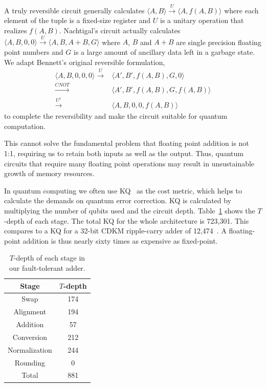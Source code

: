 \documentclass[%
reprint11,
 amsmath,amssymb,
 aps,
]{revtex4-1}
\begin{document}
\par A truly reversible circuit generally calculates $ \langle A,B
\rangle \xrightarrow{U} \langle A,f(A,B) \rangle $ where each element
of the tuple is a fixed-size register and $U$ is a unitary operation
that realizes $f(A,B)$. Nachtigal's circuit actually calculates $
\langle A,B,0,0 \rangle \xrightarrow{U} \langle A,B,A+B,G \rangle$
where $A$, $B$ and $A+B$ are single precision floating point numbers
and $G$ is a large amount of ancillary data left in a garbage
state. We adapt Bennett's original reversible formulation,
\begin{align}
   \langle A,B,0,0,0 \rangle \xrightarrow{U} & \langle A',B',f(A,B),G,0 \rangle \\\nonumber
   \xrightarrow{CNOT} & \langle A',B',f(A,B),G,f(A,B) \rangle  \\\nonumber
   \xrightarrow{U^\dag} & \langle A,B,0,0,f(A,B) \rangle 
\label{eqn:Benett}
\end{align}
to complete the reversibility and make the circuit suitable for quantum computation.

\par This cannot solve the fundamental problem that floating point
addition is not 1:1, requiring us to retain both inputs as well as the
output. Thus, quantum circuits that require many floating point
operations may result in unsustainable growth of memory resources.

In quantum computing we often use KQ~\cite{fault-tolerant} as the cost
metric, which helps to calculate the demands on quantum error
correction. KQ is calculated by multiplying the number of qubits used
and the circuit depth.  Table~\ref{tab:T-depth} shows the $T$-depth of
each stage.  The total KQ for the whole architecture is 723,301. This
compares to a KQ for a 32-bit CDKM ripple-carry adder of
12,474~\cite{cuccaro04:new-quant-ripple}. A floating-point addition is
thus nearly sixty times as expensive as fixed-point.

\begin{table}
\centering
\begin{tabular}{|c|c|}
\hline
\textbf{Stage} & \textbf{$T$-depth} \\
\hline
 Swap & 174  \\ \hline
 Alignment & 194  \\ \hline
 Addition &  57 \\ \hline
 Conversion & 212  \\ \hline
 Normalization & 244  \\ \hline
 Rounding & 0 \\ \hline 
 Total &  881 \\ \hline 
\end{tabular}
\\
\caption{$T$-depth of each stage in our fault-tolerant adder.}
\label{tab:T-depth}
\end{table} 
\end{document}
